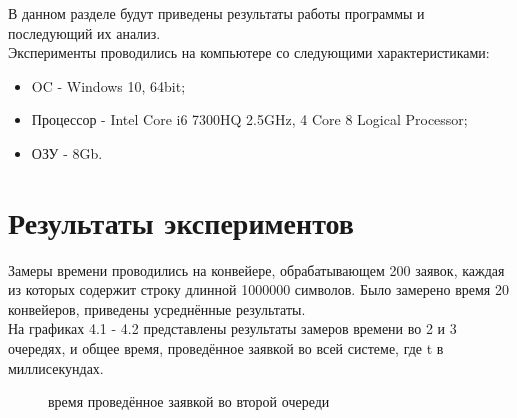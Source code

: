 \documentclass[12pt,a4paper]{report}
\begin{document}
В данном разделе будут приведены результаты работы программы и последующий их анализ.\\

Эксперименты проводились на компьютере со следующими характеристиками:
\begin{itemize}
    \item OC - Windows 10, 64bit;
    \item Процессор - Intel Core i6 7300HQ 2.5GHz, 4 Core 8 Logical Processor;
    \item ОЗУ - 8Gb.
\end{itemize}

\section{Результаты экспериментов}

Замеры времени проводились на конвейере, обрабатывающем 200 заявок, каждая из которых содержит строку 
длинной 1000000 символов. 
Было замерено время 20 конвейеров, приведены усреднённые результаты.\\

На графиках 4.1 - 4.2 представлены результаты замеров времени во 2 и 3 очередях, и общее время,
проведённое заявкой во всей системе, где t в миллисекундах.

\begin{figure}[h!]
    \caption{время проведённое заявкой во второй очереди}
    \label{fig:image}
\end{figure}
\end{document}
